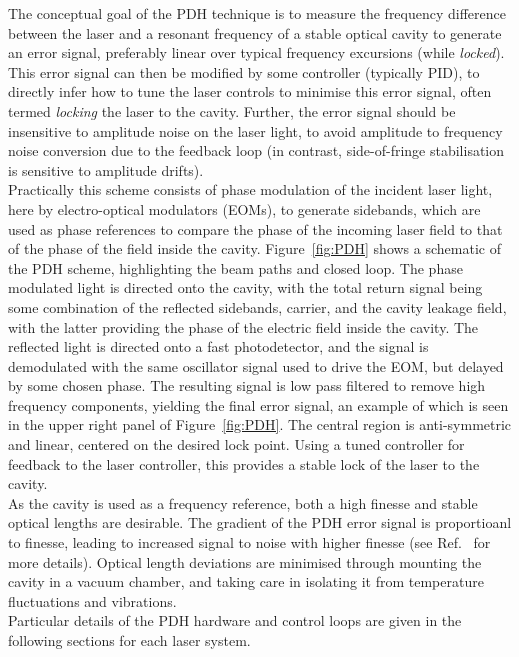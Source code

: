     The conceptual goal of the PDH technique is to measure the frequency difference between the laser and a resonant frequency of a stable optical cavity to generate an error signal, preferably linear over typical frequency excursions (while \emph{locked}). This error signal can then be modified by some controller (typically PID), to directly infer how to tune the laser controls to minimise this error signal, often termed \emph{locking} the laser to the cavity. Further, the error signal should be insensitive to amplitude noise on the laser light, to avoid amplitude to frequency noise conversion due to the feedback loop (in contrast, side-of-fringe stabilisation is sensitive to amplitude drifts).\\ Practically this scheme consists of phase modulation of the incident laser light, here by electro-optical modulators (EOMs), to generate sidebands, which are used as phase references to compare the phase of the incoming laser field to that of the phase of the field inside the cavity. Figure~\ref{fig:PDH} shows a schematic of the PDH scheme, highlighting the beam paths and closed loop. The phase modulated light is directed onto the cavity, with the total return signal being some combination of the reflected sidebands, carrier, and the cavity leakage field, with the latter providing the phase of the electric field inside the cavity. The reflected light is directed onto a fast photodetector, and the signal is demodulated with the same oscillator signal used to drive the EOM, but delayed by some chosen phase. The resulting signal is low pass filtered to remove high frequency components, yielding the final error signal, an example of which is seen in the upper right panel of Figure~\ref{fig:PDH}. The central region is anti-symmetric and linear, centered on the desired lock point. Using a tuned controller for feedback to the laser controller, this provides a stable lock of the laser to the cavity.\\
    As the cavity is used as a frequency reference, both a high finesse and stable optical lengths are desirable. The gradient of the PDH error signal is proportioanl to finesse, leading to increased signal to noise with higher finesse (see Ref.~\cite{oswald_characterization_2022} for more details). Optical length deviations are minimised through mounting the cavity in a vacuum chamber, and taking care in isolating it from temperature fluctuations and vibrations.\\
    Particular details of the PDH hardware and control loops are given in the following sections for each laser system. \\

